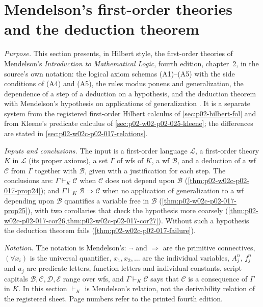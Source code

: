 \section{Mendelson's first-order theories and the deduction theorem}
\label{sec:p02-w02c-p02-017-mendelson}

\emph{Purpose.}  This section presents, in Hilbert style, the first-order
theories of Mendelson's \emph{Introduction to Mathematical Logic}, fourth edition,
chapter~2, in the source's own notation: the logical axiom schemas (A1)--(A5)
with the side conditions of (A4) and (A5), the rules modus ponens and
generalization, the dependence of a step of a deduction on a hypothesis, and
the deduction theorem with Mendelson's hypothesis on applications of
generalization \cite[\S\S 2.3--2.4, pp.~69--75]{Mendelson1997}.  It is a
separate system from the registered first-order Hilbert calculus of
\cref{sec:p02-hilbert-fol} and from Kleene's predicate calculus of
\cref{sec:p02-w02-p02-025-kleene}; the differences are stated in
\cref{sec:p02-w02c-p02-017-relations}.

\emph{Inputs and conclusions.}  The input is a first-order language
\(\mathscr L\), a first-order theory \(K\) in \(\mathscr L\) (its proper
axioms), a set \(\Gamma\) of wfs of \(K\), a wf \(\mathscr B\), and a
deduction of a wf \(\mathscr C\) from \(\Gamma\) together with
\(\mathscr B\), given with a justification for each step.  The conclusions
are: \(\Gamma\vdash_K\mathscr C\) when \(\mathscr C\) does not depend upon
\(\mathscr B\) (\cref{thm:p02-w02c-p02-017-prop24}); and
\(\Gamma\vdash_K\mathscr B\Rightarrow\mathscr C\) when no application of
generalization to a wf depending upon \(\mathscr B\) quantifies a variable
free in \(\mathscr B\) (\cref{thm:p02-w02c-p02-017-prop25}), with two
corollaries that check the hypothesis more coarsely
(\cref{thm:p02-w02c-p02-017-cor26,thm:p02-w02c-p02-017-cor27}).  Without
such a hypothesis the deduction theorem fails
(\cref{thm:p02-w02c-p02-017-failure}).

\emph{Notation.}  The notation is Mendelson's: \(\neg\) and
\(\Rightarrow\) are the primitive connectives, \((\forall x_i)\) is the
universal quantifier, \(x_1,x_2,\ldots\) are the individual variables,
\(A^n_j\), \(f^n_j\) and \(a_j\) are predicate letters, function letters and
individual constants, script capitals \(\mathscr B,\mathscr C,\mathscr D,
\mathscr E\) range over wfs, and \(\Gamma\vdash_K\mathscr C\) says that
\(\mathscr C\) is a consequence of \(\Gamma\) in \(K\).  In this section
\(\vdash_K\) is Mendelson's relation, not the derivability relation of the
registered sheet.  Page numbers refer to the printed fourth edition.

